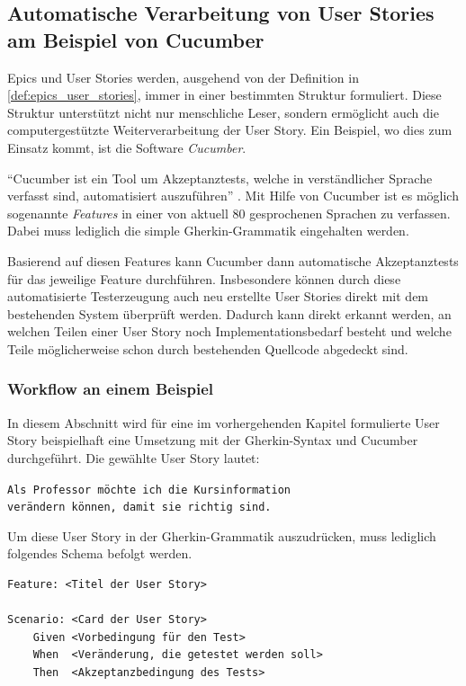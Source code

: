 \documentclass[acmtog]{acmart}
\begin{document}
\subsection{Automatische Verarbeitung von User Stories am Beispiel von Cucumber}
Epics und User Stories werden, ausgehend von der Definition in \ref{def:epics_user_stories}, immer in einer bestimmten Struktur formuliert.
Diese Struktur unterstützt nicht nur menschliche Leser, sondern ermöglicht auch die computergestützte Weiterverarbeitung der User Story.
Ein Beispiel, wo dies zum Einsatz kommt, ist die Software \emph{Cucumber}.

``Cucumber ist ein Tool um Akzeptanztests, welche in verständlicher Sprache verfasst sind, automatisiert auszuführen'' \cite{the_cucumber_open_source_project_cucumber_2025}.
Mit Hilfe von Cucumber ist es möglich sogenannte \emph{Features} in einer von aktuell 80 gesprochenen Sprachen zu verfassen.
Dabei muss lediglich die simple Gherkin-Grammatik eingehalten werden.

Basierend auf diesen Features kann Cucumber dann automatische Akzeptanztests für das jeweilige Feature durchführen.
Insbesondere können durch diese automatisierte Testerzeugung auch neu erstellte User Stories direkt mit dem bestehenden System
überprüft werden. Dadurch kann direkt erkannt werden, an welchen Teilen einer User Story noch Implementationsbedarf besteht und welche
Teile möglicherweise schon durch bestehenden Quellcode abgedeckt sind.

\subsubsection{Workflow an einem Beispiel}
In diesem Abschnitt wird für eine im vorhergehenden Kapitel formulierte User Story beispielhaft eine Umsetzung
mit der Gherkin-Syntax und Cucumber durchgeführt.
Die gewählte User Story lautet:

\texttt{Als Professor möchte ich die Kursinformation \\verändern können, damit sie richtig sind.}

Um diese User Story in der Gherkin-Grammatik auszudrücken, muss lediglich folgendes Schema befolgt werden.

\vspace*{-.3em}
\begin{verbatim}
Feature: <Titel der User Story>

Scenario: <Card der User Story>
    Given <Vorbedingung für den Test>
    When  <Veränderung, die getestet werden soll>
    Then  <Akzeptanzbedingung des Tests>
\end{verbatim}
\end{document}
